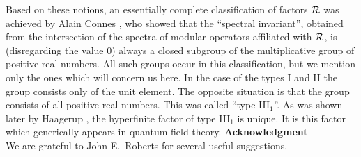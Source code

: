Based on these notions, an
essentially complete classification of  
factors ${\cal R}$ was achieved by Alain Connes  
\cite{Con}, who showed that the ``spectral invariant'', obtained from the
intersection of the spectra of modular operators
affiliated with ${\cal R}$, is (disregarding the value 0) 
always a closed subgroup of the multiplicative group of positive
real numbers. All such groups    
occur in this classification, but we mention
only the ones which will concern us here. In the case of the
types I and II the group consists only of the unit
element. The opposite situation is
that the group consists of all positive real numbers. This was called
``type III$_1$''. As was shown later by Haagerup \cite{Haa}, 
the hyperfinite factor of type III$_1$ is unique.
It is this factor which generically appears in quantum 
field theory.\newpage 
{\noindent \Large \bf Acknowledgment} \\[3mm]
We are grateful to John E.\ Roberts for several useful suggestions.
